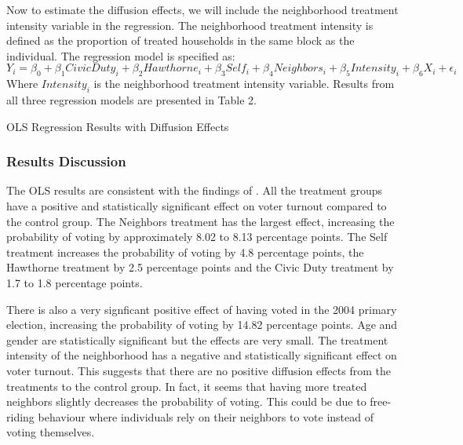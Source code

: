 \documentclass[11pt]{article}
\begin{document}
Now to estimate the diffusion effects, we will include the neighborhood treatment intensity variable in the regression. The neighborhood treatment intensity is defined as the proportion of treated households in the same block as the individual. The regression model is specified as:
\begin{equation}
    Y_i = \beta_0 + \beta_1 CivicDuty_i + \beta_2 Hawthorne_i + \beta_3 Self_i + \beta_4 Neighbors_i + \beta_5 Intensity_i + \beta_6 X_i + \epsilon_i
\end{equation}
Where $Intensity_i$ is the neighborhood treatment intensity variable. Results from all three regression models are presented in Table 2.

\begin{table}[H]
    \centering
    \caption{OLS Regression Results with Diffusion Effects}
    
    \label{tab:ols_diffusion}
\end{table}

\subsubsection{Results Discussion}
The OLS results are consistent with the findings of \cite{gerber_social_2008}. All the treatment groups have a positive and statistically significant effect on voter turnout compared to the control group. The Neighbors treatment has the largest effect, increasing the probability of voting by approximately 8.02 to 8.13 percentage points. The Self treatment increases the probability of voting by 4.8 percentage points, the Hawthorne treatment by 2.5 percentage points and the Civic Duty treatment by 1.7 to 1.8 percentage points. 

There is also a very signficant positive effect of having voted in the 2004 primary election, increasing the probability of voting by 14.82 percentage points. Age and gender are statistically significant but the effects are very small. The treatment intensity of the neighborhood has a negative and statistically significant effect on voter turnout. This suggests that there are no positive diffusion effects from the treatments to the control group. In fact, it seems that having more treated neighbors slightly decreases the probability of voting. This could be due to free-riding behaviour where individuals rely on their neighbors to vote instead of voting themselves.
\end{document}
